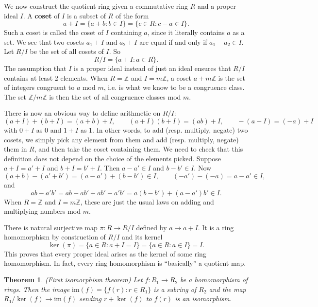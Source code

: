 \documentclass{article}
\def\Z{{\mathbb Z}}
\def\Z{{\mathbb Z}}
\newtheorem{theorem}[subsection]{Theorem}
\begin{document}
We now construct the quotient ring given a commutative ring $R$ and a proper ideal $I$. A \textbf{coset} of $I$ is a subset of $R$ of the form $$a + I = \{a + b\colon b\in I\} = \{c\in R\colon c - a\in I\}.$$ Such a coset is called the coset of $I$ containing $a$, since it literally contains $a$ as a set. We see that two cosets $a_1 + I$ and $a_2 + I$ are equal if and only if $a_1 - a_2 \in I$. Let $R/I$ be the set of all cosets of $I$. So 
$$R/I = \{a + I\colon a\in R\}.$$
The assumption that $I$ is a proper ideal instead of just an ideal ensures that $R/I$ contains at least $2$ elements. When $R = \Z$ and $I = m\Z$, a coset $a + m\Z$ is the set of integers congruent to $a$ mod $m$, i.e. is what we know to be a congruence class. The set $\Z/m\Z$ is then the set of all congruence classes mod $m$.



There is now an obvious way to define arithmetic on $R/I$:
$$(a + I) + (b + I) = (a+b) + I,\qquad (a + I)(b + I) = (ab) + I, \qquad -(a + I) = (-a)+ I$$
with $0+I$ as $0$ and $1+I$ as $1$. In other words, to add (resp. multiply, negate) two cosets, we simply pick any element from them and add (resp. multiply, negate) them in $R$, and then take the coset containing them. We need to check that this definition does not depend on the choice of the elements picked. Suppose $a+I = a'+I$ and $b+I = b'+I$. Then $a - a'\in I$ and $b - b'\in I$. Now
$$(a + b) - (a' + b') = (a - a') + (b - b') \in I,\qquad (-a') - (-a) = a - a'\in I,$$
and
$$ab - a'b' = ab - ab' + ab' - a'b' = a(b - b') + (a - a')b' \in I.$$
When $R = \Z$ and $I = m\Z$, these are just the usual laws on adding and multiplying numbers mod $m$.

There is natural surjective map $\pi:R\rightarrow R/I$ defined by $a\mapsto a+I$. It is a ring homomorphism by construction of $R/I$ and its kernel
$$\ker(\pi) = \{a\in R\colon a + I = I\} = \{a\in R\colon a\in I\} = I.$$
This proves that every proper ideal arises as the kernel of some ring homomorphism. In fact, every ring homomorphism is ``basically'' a quotient map. %

\begin{theorem}
    (First isomorphism theorem) Let $f:R_1\rightarrow R_2$ be a homomorphism of rings. Then the image $\mathrm{im}(f) = \{f(r)\colon r\in R_1\}$ is a subring of $R_2$ and the map $R_1/\ker(f)\rightarrow\mathrm{im}(f)$ sending $r + \ker(f)$ to $f(r)$ is an isomorphism.
\end{theorem}
\end{document}
